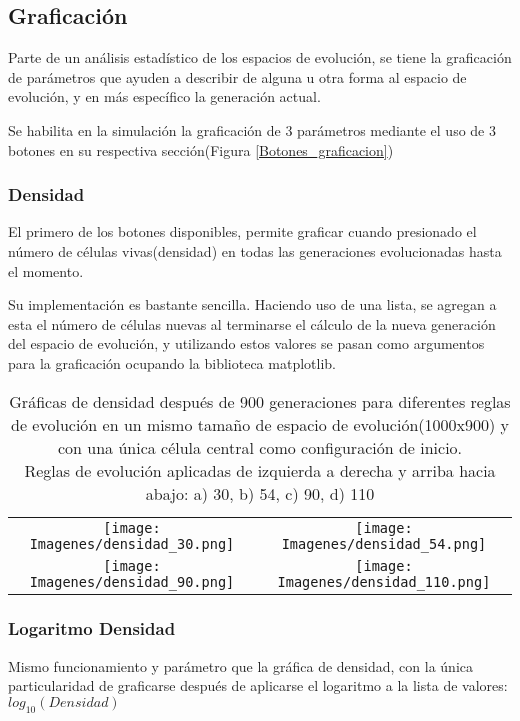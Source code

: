 \documentclass[]{article}
\begin{document}
		\newpage
		\subsection{Graficación}
			\justifying
			Parte de un análisis estadístico de los espacios de evolución, se tiene la graficación de parámetros que ayuden a describir de alguna u otra forma al espacio de evolución, y en más específico la generación actual.
			
			\hfill\break
			\justifying	
			Se habilita en la simulación la graficación de 3 parámetros mediante el uso de 3 botones en su respectiva sección(Figura \ref{Botones_graficacion})
		
			\subsubsection{Densidad}
				\justifying
				El primero de los botones disponibles, permite graficar cuando presionado el número de células vivas(densidad) en todas las generaciones evolucionadas hasta el momento.
				
				\hfill\break
				\justifying
				Su implementación es bastante sencilla. Haciendo uso de una lista, se agregan a esta el número de células nuevas al terminarse el cálculo de la nueva generación del espacio de evolución, y utilizando estos valores se pasan como argumentos para la graficación ocupando la biblioteca matplotlib.
				
				\begin{table}[!h]
					\centering
					\begin{tabular}{c c}
						\texttt{[image: Imagenes/densidad\_30.png]} & \texttt{[image: Imagenes/densidad\_54.png]} \\
						\texttt{[image: Imagenes/densidad\_90.png]} & \texttt{[image: Imagenes/densidad\_110.png]} 
					\end{tabular}
					\caption{Gráficas de densidad después de 900 generaciones para diferentes reglas de evolución en un mismo tamaño de espacio de evolución(1000x900) y con una única célula central como configuración de inicio.\\ Reglas de evolución aplicadas de izquierda a derecha y arriba hacia abajo: a) 30, b) 54, c) 90, d) 110}
				\end{table}
				
			\subsubsection{Logaritmo Densidad}
				\justifying
				Mismo funcionamiento y parámetro que la gráfica de densidad, con la única particularidad de graficarse después de aplicarse el logaritmo a la lista de valores: $log_{10}(Densidad)$
				
\end{document}

